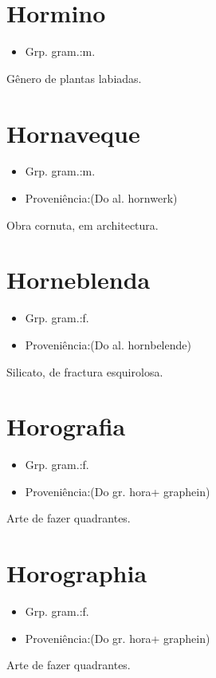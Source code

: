 \documentclass{article}
\begin{document}
\section{Hormino}
\begin{itemize}
\item {Grp. gram.:m.}
\end{itemize}
Gênero de plantas labiadas.
\section{Hornaveque}
\begin{itemize}
\item {Grp. gram.:m.}
\end{itemize}
\begin{itemize}
\item {Proveniência:(Do al. \textunderscore hornwerk\textunderscore )}
\end{itemize}
Obra cornuta, em architectura.
\section{Horneblenda}
\begin{itemize}
\item {Grp. gram.:f.}
\end{itemize}
\begin{itemize}
\item {Proveniência:(Do al. \textunderscore hornbelende\textunderscore )}
\end{itemize}
Silicato, de fractura esquirolosa.
\section{Horografia}
\begin{itemize}
\item {Grp. gram.:f.}
\end{itemize}
\begin{itemize}
\item {Proveniência:(Do gr. \textunderscore hora\textunderscore  + \textunderscore graphein\textunderscore )}
\end{itemize}
Arte de fazer quadrantes.
\section{Horographia}
\begin{itemize}
\item {Grp. gram.:f.}
\end{itemize}
\begin{itemize}
\item {Proveniência:(Do gr. \textunderscore hora\textunderscore  + \textunderscore graphein\textunderscore )}
\end{itemize}
Arte de fazer quadrantes.
\end{document}
